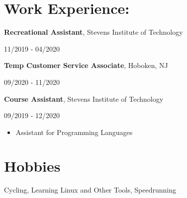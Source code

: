 \documentclass[10pt,letterpaper]{article}
\begin{document}
  \section{Work Experience:}
    \textbf{Recreational Assistant}, Stevens Institute of Technology\hfill
    \begin{minipage}[t]{1.2in}
      11/2019 - 04/2020
    \end{minipage}
    
    \textbf{Temp Customer Service Associate}, Hoboken, NJ \hfill
    \begin{minipage}[t]{1.2in}
      09/2020 - 11/2020
    \end{minipage}

	\textbf{Course Assistant}, Stevens Institute of Technology\hfill
	\begin{minipage}[t]{1.2in}
		09/2019 - 12/2020
	\end{minipage}
	\begin{itemize}
		\item Assistant for Programming Languages
	\end{itemize}
    
  \section{Hobbies}
    Cycling, Learning Linux and Other Tools, Speedrunning
    
\end{document}
